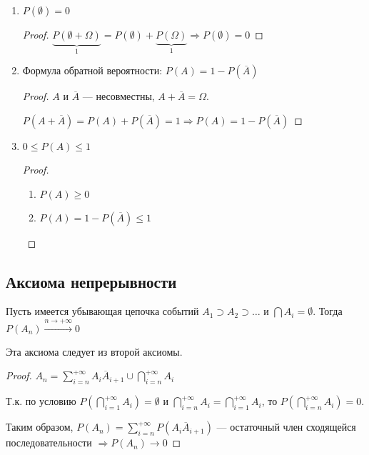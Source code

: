 \documentclass[12pt, a4paper, oneside]{book}
\begin{document}
\begin{prop}\itemfix
    \begin{enumerate}
        \item \(P(\emptyset) = 0\)

              \begin{proof}
                  \(\underbrace{P(\emptyset + \Omega)}_{1} = P(\emptyset) + \underbrace{P(\Omega)}_1 \Rightarrow P(\emptyset) = 0\)
              \end{proof}

        \item Формула обратной вероятности: \(P(A) = 1 - P(\overline A)\)

              \begin{proof}
                  \(A\) и \(\overline A\) --- несовместны, \(A + \overline A = \Omega\).

                  \(P(A + \overline A) = P(A) + P(\overline A) = 1 \Rightarrow P(A) = 1 - P(\overline A)\)
              \end{proof}

        \item \(0 \leq P(A) \leq 1\)

              \begin{proof}
                  \begin{enumerate}
                      \item \(P(A) \geq 0\)
                      \item \(P(A) = 1 - P(\overline A) \leq 1\)
                  \end{enumerate}
              \end{proof}
    \end{enumerate}
\end{prop}

\subsection{Аксиома непрерывности}

Пусть имеется убывающая цепочка событий \(A_1 \supset A_2 \supset \dots \) и \(\bigcap A_i = \emptyset\). Тогда \(P(A_n) \xrightarrow{n \to +\infty} 0\)

\? %

\begin{theorem}
    Эта аксиома следует из второй аксиомы.
\end{theorem}
\begin{proof}
    \(A_n = \sum_{i = n}^{+\infty} A_i \overline A_{i+1} \cup \bigcap_{i = n}^{+\infty} A_i\)

    \? %

    Т.к. по условию \(P(\bigcap_{i = 1}^{+\infty} A_i) = \emptyset\) и \(\bigcap_{i = n}^{+\infty} A_i = \bigcap_{i = 1}^{+\infty} A_i\), то \(P(\bigcap_{i = n}^{+\infty} A_i) = 0\).

    Таким образом, \(P(A_n) = \sum_{i = n}^{+\infty} P(A_i \overline A_{i + 1})\) --- остаточный член сходящейся последовательности \( \Rightarrow P(A_n) \to 0\)
\end{proof}
\end{document}
